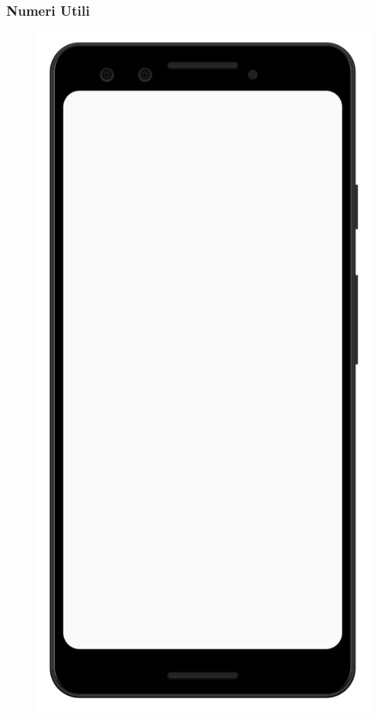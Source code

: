 \documentclass[12pt,a4paper,twoside,openright,titlepage]{book}
\begin{document}
\subsubsection{Numeri Utili}
\begin{figure}[H]
\centering
\includegraphics[scale = 0.2]{mobile}

\end{figure}
\end{document}
